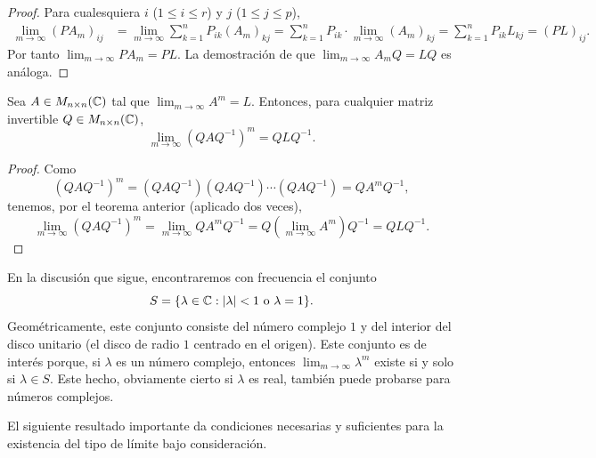 \documentclass[12pt,a4paper]{book}
\begin{document}
    \begin{proof}
        Para cualesquiera $i$ ($1\leq i\leq r$) y $j$ ($1\leq j\leq p$),
        \begin{align*}
            \lim_{m\to\infty}(PA_m)_{ij}&=\lim_{m\to\infty}\sum_{k=1}^{n}P_{ik}(A_m)_{kj}
            =\sum_{k=1}^{n}P_{ik}\cdot\lim_{m\to\infty}(A_m)_{kj}=\sum_{k=1}^{n}P_{ik}L_{kj}=(PL)_{ij}.
        \end{align*}
        Por tanto $\lim_{m\to\infty}PA_m=PL$. La demostración de que $\lim_{m\to\infty}A_mQ=LQ$ es análoga.
    \end{proof}

    \begin{corolario}
        Sea $A\in M_{n\times n}(\mathbb{C})$ tal que $\lim_{m\to\infty}A^m=L$. Entonces, para cualquier matriz invertible $Q\in M_{n\times n}(\mathbb{C})$,
        \begin{equation*}
            \lim_{m\to\infty}(QAQ^{-1})^m=QLQ^{-1}.
        \end{equation*}
    \end{corolario}

    \begin{proof}
        Como
        \begin{equation*}
            (QAQ^{-1})^m=(QAQ^{-1})(QAQ^{-1})\cdots(QAQ^{-1})=QA^mQ^{-1},
        \end{equation*}
        tenemos, por el teorema anterior (aplicado dos veces),
        \begin{equation*}
            \lim_{m\to\infty}(QAQ^{-1})^m=\lim_{m\to\infty}QA^mQ^{-1}=Q\left(\lim_{m\to\infty}A^m\right)Q^{-1}=QLQ^{-1}.
        \end{equation*}
    \end{proof}

    En la discusión que sigue, encontraremos con frecuencia el conjunto
    \begin{equation*}
        S=\{\lambda\in\mathbb{C}: |\lambda|<1 \text{ o } \lambda=1\}.
    \end{equation*}
    Geométricamente, este conjunto consiste del número complejo $1$ y del interior del disco unitario (el disco de radio $1$ centrado en el origen). Este conjunto es de interés porque, si $\lambda$ es un número complejo, entonces $\lim_{m\to\infty}\lambda^m$ existe si y solo si $\lambda\in S$. Este hecho, obviamente cierto si $\lambda$ es real, también puede probarse para números complejos.

    El siguiente resultado importante da condiciones necesarias y suficientes para la existencia del tipo de límite bajo consideración.
\end{document}
